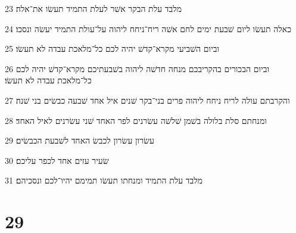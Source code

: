 \par 23 מלבד עלת הבקר אשׁר לעלת התמיד תעשׂו את־אלה׃
\par 24 כאלה תעשׂו ליום שׁבעת ימים לחם אשׁה ריח־ניחח ליהוה על־עולת התמיד יעשׂה ונסכו׃
\par 25 וביום השׁביעי מקרא־קדשׁ יהיה לכם כל־מלאכת עבדה לא תעשׂו׃
\par 26 וביום הבכורים בהקריבכם מנחה חדשׁה ליהוה בשׁבעתיכם מקרא־קדשׁ יהיה לכם כל־מלאכת עבדה לא תעשׂו׃
\par 27 והקרבתם עולה לריח ניחח ליהוה פרים בני־בקר שׁנים איל אחד שׁבעה כבשׂים בני שׁנה׃
\par 28 ומנחתם סלת בלולה בשׁמן שׁלשׁה עשׂרנים לפר האחד שׁני עשׂרנים לאיל האחד׃
\par 29 עשׂרון עשׂרון לכבשׂ האחד לשׁבעת הכבשׂים׃
\par 30 שׂעיר עזים אחד לכפר עליכם׃
\par 31 מלבד עלת התמיד ומנחתו תעשׂו תמימם יהיו־לכם ונסכיהם׃

\chapter{29}


